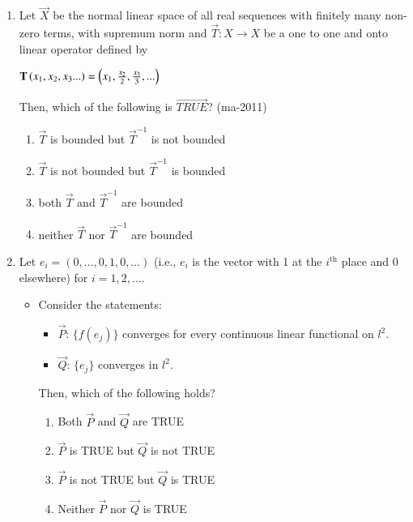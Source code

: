 \documentclass[journal,12pt,onecolumn]{IEEEtran}
\theoremstyle{remark}
\begin{document}
\begin{enumerate}
\begin{multicols}{4}
\begin{enumerate}
    \end{enumerate}
    \end{multicols}
    \item Let $\vec{X}$ be the normal linear space of all real sequences with finitely many non-zero terms, with supremum norm and $\vec{T} : X \rightarrow X$ be a one to one and onto linear operator defined by \\
    \begin{center}
    	$\mathbf{T} \left(x_1,x_2,x_3...\right) = \left(x_1,\frac{x_2}{2}, \frac{x_3}{3},...\right)$
    \end{center}
    Then, which of the following is $\vec{TRUE}$? 
    \hfill{(ma-2011)}
    \begin{multicols}{2}
    \begin{enumerate}
    \item $\vec{T}$ is bounded but $\vec{T}^{-1}$ is not bounded
    \item $\vec{T}$ is not bounded but $\vec{T}^{-1}$ is bounded
    \item both $\vec{T}$ and $\vec{T}^{-1}$ are bounded
    \item neither  $\vec{T}$ nor $\vec{T}^{-1}$ are bounded
    \end{enumerate}
    \end{multicols}
    \item Let $e_i = (0, \ldots, 0, 1, 0, \ldots)$ (i.e., $e_i$ is the vector with 1 at the $i^{\text{th}}$ place and 0 elsewhere) for $i = 1, 2, \ldots$.
    \begin{itemize}
    	\item[] Consider the statements:
    	\begin{itemize}
    		\item $\vec{P}$: $\{f(e_j)\}$ converges for every continuous linear functional on $l^2$.
    		\item $\vec{Q}$: $\{e_j\}$ converges in $l^2$.
    	\end{itemize}
    	Then, which of the following holds?
    	\begin{enumerate}
    		\item Both $\vec{P}$ and $\vec{Q}$ are TRUE
    		\item $\vec{P}$ is TRUE but $\vec{Q}$ is not TRUE
    		\item $\vec{P}$ is not TRUE but $\vec{Q}$ is TRUE
    		\item Neither $\vec{P}$ nor $\vec{Q}$ is TRUE
    	\end{enumerate}
    \end{itemize}
    

\end{enumerate}
\end{document}

